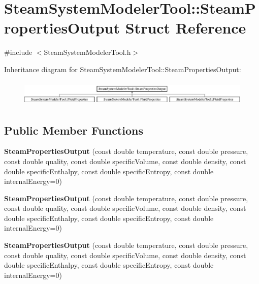 \hypertarget{struct_steam_system_modeler_tool_1_1_steam_properties_output}{}\section{Steam\+System\+Modeler\+Tool\+:\+:Steam\+Properties\+Output Struct Reference}
\label{struct_steam_system_modeler_tool_1_1_steam_properties_output}


{\ttfamily \#include $<$Steam\+System\+Modeler\+Tool.\+h$>$}

Inheritance diagram for Steam\+System\+Modeler\+Tool\+:\+:Steam\+Properties\+Output\+:\begin{figure}[H]
\begin{center}
\leavevmode
\includegraphics[height=1.244444cm]{dd/d51/struct_steam_system_modeler_tool_1_1_steam_properties_output}
\end{center}
\end{figure}
\subsection*{Public Member Functions}
\begin{DoxyCompactItemize}
\item 
\mbox{\label{struct_steam_system_modeler_tool_1_1_steam_properties_output_a71898911793b8e08d8565c206335c3ae}} 
{\bfseries Steam\+Properties\+Output} (const double temperature, const double pressure, const double quality, const double specific\+Volume, const double density, const double specific\+Enthalpy, const double specific\+Entropy, const double internal\+Energy=0)
\item 
\mbox{\label{struct_steam_system_modeler_tool_1_1_steam_properties_output_a71898911793b8e08d8565c206335c3ae}} 
{\bfseries Steam\+Properties\+Output} (const double temperature, const double pressure, const double quality, const double specific\+Volume, const double density, const double specific\+Enthalpy, const double specific\+Entropy, const double internal\+Energy=0)
\item 
\mbox{\label{struct_steam_system_modeler_tool_1_1_steam_properties_output_a71898911793b8e08d8565c206335c3ae}} 
{\bfseries Steam\+Properties\+Output} (const double temperature, const double pressure, const double quality, const double specific\+Volume, const double density, const double specific\+Enthalpy, const double specific\+Entropy, const double internal\+Energy=0)
\end{DoxyCompactItemize}
